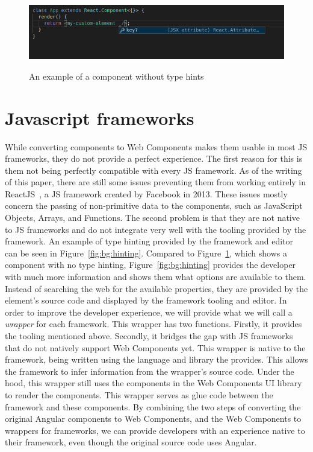 \begin{figure}[h]
  \caption{An example of a component without type hints}
  \includegraphics[width=\columnwidth]{figures/background/no-hinting.png}
  \label{fig:bg:no-hinting}
  \centering
\end{figure}

\section{Javascript frameworks}\label{sec:bg:jsframeworks}
While converting components to Web Components makes them usable in most JS frameworks, they do not provide a perfect experience. The first reason for this is them not being perfectly compatible with every JS framework. As of the writing of this paper, there are still some issues preventing them from working entirely in ReactJS~, a JS framework created by Facebook in 2013. These issues mostly concern the passing of non-primitive data to the components, such as JavaScript Objects, Arrays, and Functions. The second problem is that they are not native to JS frameworks and do not integrate very well with the tooling provided by the framework. An example of type hinting provided by the framework and editor can be seen in Figure~\ref{fig:bg:hinting}. Compared to Figure~\ref{fig:bg:no-hinting}, which shows a component with no type hinting, Figure~\ref{fig:bg:hinting} provides the developer with much more information and shows them what options are available to them. Instead of searching the web for the available properties, they are provided by the element's source code and displayed by the framework tooling and editor. In order to improve the developer experience, we will provide what we will call a \emph{wrapper} for each framework. This wrapper has two functions. Firstly, it provides the tooling mentioned above. Secondly, it bridges the gap with JS frameworks that do not natively support Web Components yet. This wrapper is native to the framework, being written using the language and library the provides. This allows the framework to infer information from the wrapper's source code. Under the hood, this wrapper still uses the components in the Web Components UI library to render the components. This wrapper serves as glue code between the framework and these components. By combining the two steps of converting the original Angular components to Web Components, and the Web Components to wrappers for frameworks, we can provide developers with an experience native to their framework, even though the original source code uses Angular.

